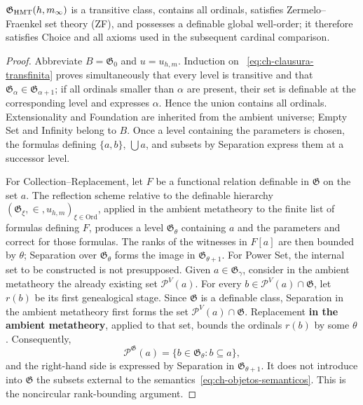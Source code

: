 \begin{lemma}
\label{thm:ch-6b}
\(\mathfrak G_{\rm HMT}(h,m_\infty)\) is a transitive class, contains all
ordinals, satisfies Zermelo--Fraenkel set theory (ZF), and possesses a
definable global well-order; it therefore satisfies Choice and all axioms used
in the subsequent cardinal comparison.

\end{lemma}
\begin{proof}
Abbreviate \(B=\mathfrak G_0\) and \(u=u_{h,m}\). Induction on
~\eqref{eq:ch-clausura-transfinita} proves simultaneously that every level is
transitive and that \(\mathfrak G_\alpha\in\mathfrak G_{\alpha+1}\); if all
ordinals smaller than \(\alpha\) are present, their set is definable at the
corresponding level and expresses \(\alpha\). Hence the union contains all
ordinals. Extensionality and Foundation are inherited from the ambient
universe; Empty Set and Infinity belong to \(B\). Once a level containing the
parameters is chosen, the formulas defining \(\{a,b\}\), \(\bigcup a\), and
subsets by Separation express them at a successor level.

For Collection--Replacement, let \(F\) be a functional relation definable in
\(\mathfrak G\) on the set \(a\). The reflection scheme relative to the
definable hierarchy
\((\mathfrak G_\xi,\in,u_{h,m})_{\xi\in\mathrm{Ord}}\), applied in the ambient
metatheory to the finite list of formulas defining \(F\), produces a level
\(\mathfrak G_\theta\) containing \(a\) and the parameters and correct for
those formulas. The ranks of the witnesses in \(F[a]\) are then bounded by
\(\theta\); Separation over \(\mathfrak G_\theta\) forms the image in
\(\mathfrak G_{\theta+1}\). For Power Set, the internal set to be constructed
is not presupposed. Given \(a\in\mathfrak G_\gamma\), consider in the ambient
metatheory the already existing set \(\mathcal P^V(a)\). For every
\(b\in\mathcal P^V(a)\cap\mathfrak G\), let \(r(b)\) be its first
genealogical stage. Since \(\mathfrak G\) is a definable class, Separation in
the ambient metatheory first forms the set
\(\mathcal P^V(a)\cap\mathfrak G\). Replacement \textbf{in the ambient
metatheory}, applied to that set, bounds the ordinals \(r(b)\) by some
\(\theta\). Consequently,
\[
 \mathcal P^{\mathfrak G}(a)
 =\{b\in\mathfrak G_\theta:b\subseteq a\},
\]
and the right-hand side is expressed by Separation in
\(\mathfrak G_{\theta+1}\). It does not introduce into \(\mathfrak G\) the
subsets external to the semantics~\eqref{eq:ch-objetos-semanticos}. This is the
noncircular rank-bounding argument.


\end{proof}
